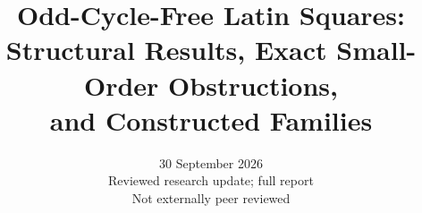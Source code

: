 \documentclass[11pt]{article}
\title{Odd-Cycle-Free Latin Squares:\\
Structural Results, Exact Small-Order Obstructions,\\
and Constructed Families}
\author{}
\date{30 September 2026\\\small Reviewed research update; full report\\Not externally peer reviewed}
\begin{document}
\maketitle


\tableofcontents

























\footnotesize


\end{document}
